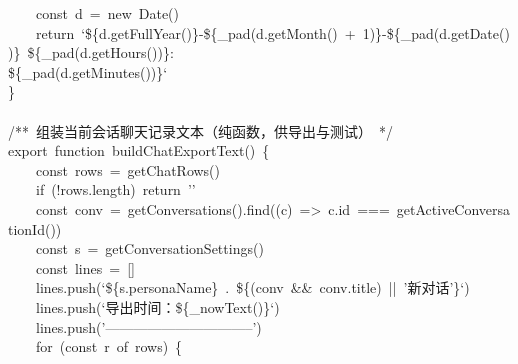 \documentclass[a4paper,10pt]{article}
\begin{document}
{~~~~const~d~=~new~Date()\\
~~~~return~`\$\{d.getFullYear()\}-\$\{\_pad(d.getMonth()~+~1)\}-\$\{\_pad(d.getDate())\}~\$\{\_pad(d.getHours())\}:\\
\$\{\_pad(d.getMinutes())\}`\\
\}\\
\mbox{}\\
/**~组装当前会话聊天记录文本（纯函数，供导出与测试）~*/\\
export~function~buildChatExportText()~\{\\
~~~~const~rows~=~getChatRows()\\
~~~~if~(!rows.length)~return~''\\
~~~~const~conv~=~getConversations().find((c)~=>~c.id~===~getActiveConversationId())\\
~~~~const~s~=~getConversationSettings()\\
~~~~const~lines~=~[]\\
~~~~lines.push(`\$\{s.personaName\}~.~\$\{(conv~\&\&~conv.title)~||~'新对话'\}`)\\
~~~~lines.push(`导出时间：\$\{\_nowText()\}`)\\
~~~~lines.push('--------------------------------')\\
~~~~for~(const~r~of~rows)~\{
}

\newpage
\end{document}
